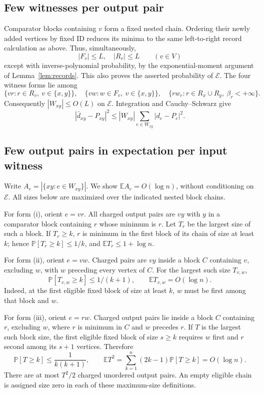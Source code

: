 \documentclass[11pt]{article}
\theoremstyle{definition}
\newcommand{\E}{\mathbb E}
\newcommand{\Prb}{\mathbb P}
\begin{document}
\subsection{Few witnesses per output pair}

Comparator blocks containing $v$ form a fixed nested chain. Ordering
their newly added vertices by fixed ID reduces its minima to the same
left-to-right record calculation as above. Thus, simultaneously,
\[
 |F_v|\le L,\quad |R_v|\le L\qquad(v\in V)
\]
except with inverse-polynomial probability, by the exponential-moment argument of Lemma~\ref{lem:records}. This also proves the asserted probability of $\mathcal E$.
The four witness forms lie among
\[
 \{vr:r\in R_v,\ v\in\{x,y\}\},\quad
 \{vw:w\in F_v,\ v\in\{x,y\}\},\quad
 \{rw_r:r\in R_x\cup R_y,\ \beta_r<+\infty\}.
\]
Consequently $|W_{xy}|\le O(L)$ on $\mathcal E$.
Integration and Cauchy--Schwarz give
\begin{equation}\label{l2:eq:witness-square}
 |\bar d_{xy}-P_{xy}|^2
 \le |W_{xy}|\sum_{e\in W_{xy}}|d_e-P_e|^2.
\end{equation}

\subsection{Few output pairs in expectation per input witness}

Write $A_e=|\{xy:e\in W_{xy}\}|$. We show
$\E A_e=O(\log n)$, without conditioning on $\mathcal E$.
All sizes below are maximized over the indicated nested block chains.

For form (i), orient $e=vr$. All charged output pairs are $vy$ with
$y$ in a comparator block containing $r$ whose minimum is $r$.
Let $T_r$ be the largest size of such a block. If $T_r\ge k$, $r$ is
minimum in the first block of its chain of size at least $k$; hence
$\Prb[T_r\ge k]\le1/k$, and $\E T_r\le1+\log n$.

For form (ii), orient $e=vw$. Charged pairs are $vy$ inside a block
$C$ containing $v$, excluding $w$, with $w$ preceding every vertex of
$C$. For the largest such size $T_{v,w}$,
\[
 \Prb[T_{v,w}\ge k]\le1/(k+1),\qquad
 \E T_{v,w}=O(\log n).
\]
Indeed, at the first eligible fixed block of size at least $k$, $w$
must be first among that block and $w$.

For form (iii), orient $e=rw$. Charged output pairs lie inside a block
$C$ containing $r$, excluding $w$, where $r$ is minimum in $C$ and
$w$ precedes $r$. If $T$ is the largest such block size, the first
eligible fixed block of size $s\ge k$ requires $w$ first and $r$ second
among its $s+1$ vertices. Therefore
\[
 \Prb[T\ge k]\le\frac1{k(k+1)},\qquad
 \E T^2=\sum_{k=1}^n(2k-1)\Prb[T\ge k]=O(\log n).
\]
There are at most $T^2/2$ charged unordered output pairs. An empty eligible chain is assigned size zero in each of these maximum-size definitions.
\end{document}
